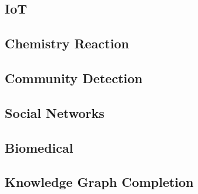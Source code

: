 
\subsection{IoT}


\subsection{Chemistry Reaction}


\subsection{Community Detection}


\subsection{Social Networks}



\subsection{Biomedical}


%

\subsection{Knowledge Graph Completion}


% 

